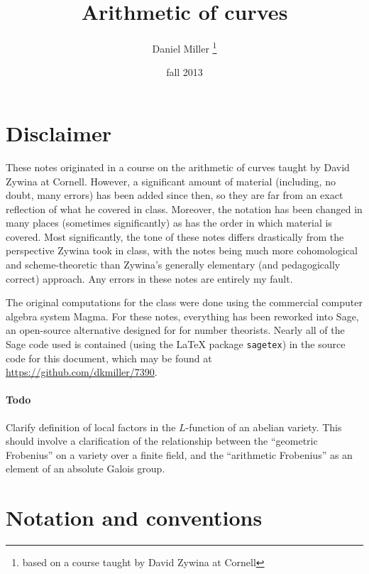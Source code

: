 \documentclass{article}
\title{Arithmetic of curves}
\author{Daniel Miller
  \thanks{based on a course taught by David Zywina at Cornell}}
\date{fall 2013}
\begin{document}
\maketitle
\tableofcontents





\newpage
\section*{Disclaimer}

These notes originated in a course on the arithmetic of curves taught by David 
Zywina at Cornell. However, a significant amount of material (including, no 
doubt, many errors) has been added since then, so they are far from an exact 
reflection of what he covered in class. Moreover, the notation has been changed 
in many places (sometimes significantly) as has the order in which material is 
covered. Most significantly, the tone of these notes differs drastically 
from the perspective Zywina took in class, with the notes being much more 
cohomological and scheme-theoretic than Zywina's generally elementary (and 
pedagogically correct) approach. Any errors in these notes are entirely my 
fault. 

The original computations for the class were done using the commercial 
computer algebra system Magma. For these notes, everything has been reworked 
into Sage, an open-source alternative designed for for number theorists. Nearly 
all of the Sage code used is contained (using the \LaTeX{} package 
\texttt{sagetex}) in the source code for this document, which may be found at 
\url{https://github.com/dkmiller/7390}. 


\paragraph{Todo}
Clarify definition of local factors in the $L$-function of an abelian variety. 
This should involve a clarification of the relationship between the ``geometric 
Frobenius'' on a variety over a finite field, and the ``arithmetic Frobenius'' 
as an element of an absolute Galois group. 





\section*{Notation and conventions}
\end{document}
